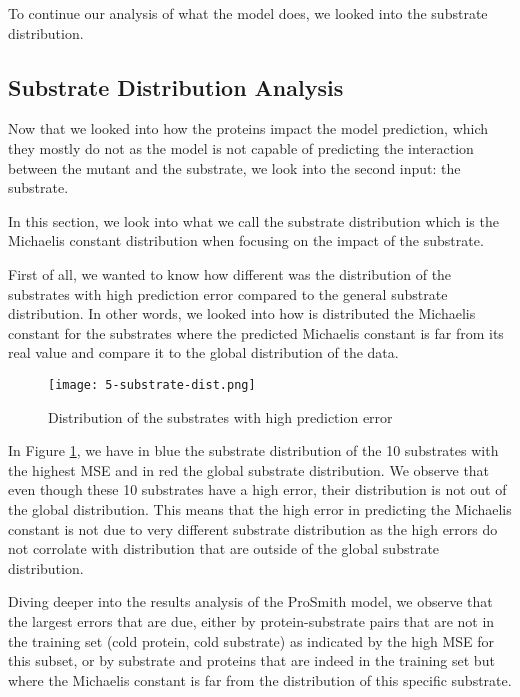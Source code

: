 To continue our analysis of what the model does, we looked into the substrate distribution.

\subsection{Substrate Distribution Analysis}

Now that we looked into how the proteins impact the model prediction, which they mostly do not as the model
is not capable of predicting the interaction between the mutant and the substrate, we look into the second input:
the substrate.

In this section, we look into what we call the substrate distribution which is the Michaelis constant distribution
when focusing on the impact of the substrate. 

First of all, we wanted to know how different was the distribution of the substrates with high prediction error
compared to the general substrate distribution. In other words, we looked into how is distributed the Michaelis
constant for the substrates where the predicted Michaelis constant is far from its real value and compare it
to the global distribution of the data.

\begin{figure}
    \centering
    \texttt{[image: 5-substrate-dist.png]}
    \caption{Distribution of the substrates with high prediction error}
    \label{fig:substratedist}
  \end{figure}

In Figure \ref{fig:substratedist}, we have in blue the substrate distribution of the 10 substrates with the
highest MSE and in red the global substrate distribution. We observe that even though these 10 substrates
have a high error, their distribution is not out of the global distribution. This means that the high error
in predicting the Michaelis constant is not due to very different substrate distribution as the high errors
do not corrolate with distribution that are outside of the global substrate distribution.

Diving deeper into the results analysis of the ProSmith model, we observe that the largest errors that are
due, either by protein-substrate pairs that are not in the training set (cold protein, cold substrate) as
indicated by the high MSE for this subset, or by substrate and proteins that are indeed in the training set
but where the Michaelis constant is far from the distribution of this specific substrate.

